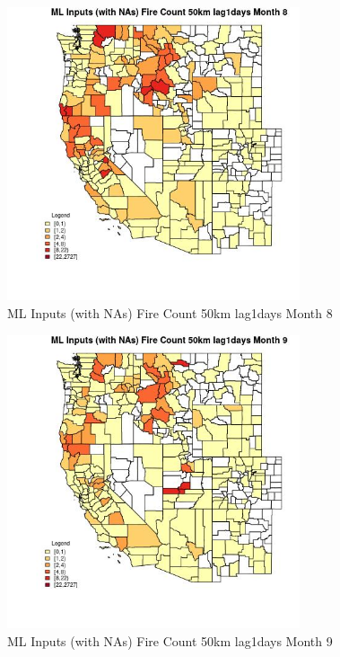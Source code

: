 \begin{figure} 
\centering  
\includegraphics[width=0.77\textwidth]{Code_Outputs/Report_ML_input_PM25_Step4_part_f_de_duplicated_aveswNAs_CountyFire_Count_50km_lag1daysmedianMonth8.jpg} 
\caption{\label{fig:Report_ML_input_PM25_Step4_part_f_de_duplicated_aveswNAsCountyFire_Count_50km_lag1daysmedianMonth8}ML Inputs (with NAs) Fire Count 50km lag1days Month 8} 
\end{figure} 
 

\begin{figure} 
\centering  
\includegraphics[width=0.77\textwidth]{Code_Outputs/Report_ML_input_PM25_Step4_part_f_de_duplicated_aveswNAs_CountyFire_Count_50km_lag1daysmedianMonth9.jpg} 
\caption{\label{fig:Report_ML_input_PM25_Step4_part_f_de_duplicated_aveswNAsCountyFire_Count_50km_lag1daysmedianMonth9}ML Inputs (with NAs) Fire Count 50km lag1days Month 9} 
\end{figure} 
 

